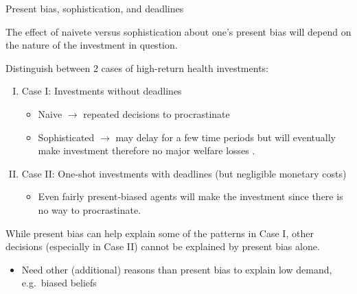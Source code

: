 \documentclass[aspectratio=169, 10pt, handout]{beamer}
\newenvironment{wideitemize}{\itemize\addtolength{\itemsep}{10pt}}{\enditemize}
\begin{document}
\begin{frame}{Present bias, sophistication, and deadlines}

\begin{wideitemize}

	\item The effect of naivete versus sophistication about one's present bias will depend on the nature of the investment in question. 
	
	\item Distinguish between 2 cases of high-return health investments:

	\begin{enumerate}[(I)]
	
	\item Case I: Investments without deadlines 
	
	\begin{itemize}
	
		\item Naive $\rightarrow$ repeated decisions to procrastinate
		\item Sophisticated $\rightarrow$ may delay for a few time periods but will eventually make investment therefore no major welfare losses
		\citep{ODonoghue2001}.
		
	\end{itemize}

	\item Case II: One-shot investments with deadlines (but negligible monetary costs)

	\begin{itemize}
	
		\item Even fairly present-biased agents will make the investment since there is no way to procrastinate.

	\end{itemize}
	
	\end{enumerate}

    \item While present bias can help explain some of the patterns in Case I, other decisions (especially in Case II) cannot be explained by present bias alone.
    
    \begin{itemize}
    
        \item Need other (additional) reasons than present bias to explain low demand, e.g.\ biased beliefs

    \end{itemize}
    
	
\end{wideitemize}

\end{frame}
\end{document}
